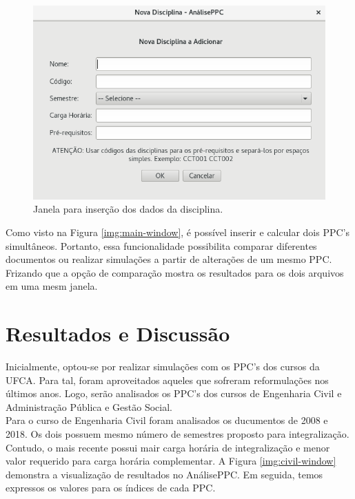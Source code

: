 \documentclass[a4paper, 12pt]{article}
\begin{document}
\begin{figure}[h]
\centering
\includegraphics[scale=0.5]{course-window}
\caption{Janela para inserção dos dados da disciplina.}
\label{img:course-window}
\end{figure}

Como visto na Figura \ref{img:main-window}, é possível inserir e calcular dois PPC's simultâneos. Portanto, essa funcionalidade possibilita comparar diferentes 
documentos ou realizar simulações a partir de alterações de um mesmo PPC. Frizando que a opção de comparação mostra os resultados para os dois arquivos em 
uma mesm janela. \\

\section*{Resultados e Discussão}

Inicialmente, optou-se por realizar simulações com os PPC's dos cursos da UFCA. Para tal, foram aproveitados aqueles que sofreram reformulações nos últimos anos. 
Logo, serão analisados os PPC's dos cursos de Engenharia Civil e Administração 
Pública e Gestão Social. \\

Para o curso de Engenharia Civil foram analisados os ducumentos de 2008 e 2018. Os dois possuem mesmo número de semestres proposto para integralização. Contudo, 
o mais recente possui mair carga horária de integralização e menor valor requerido para carga horária complementar. A Figura \ref{img:civil-window} demonstra a visualização de resultados no AnálisePPC. Em seguida, temos expressos os valores 
para os índices de cada PPC. \\
\end{document}

